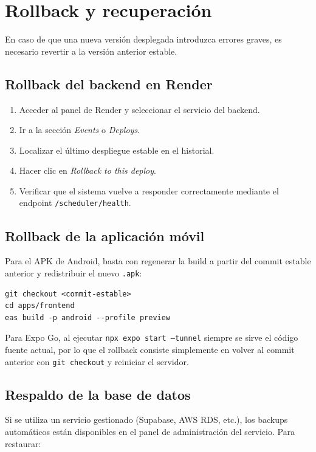 \section{Rollback y recuperación}

En caso de que una nueva versión desplegada introduzca errores graves, es necesario revertir a la versión anterior estable.

\subsection{Rollback del backend en Render}

\begin{enumerate}
    \item Acceder al panel de Render y seleccionar el servicio del backend.
    \item Ir a la sección \textit{Events} o \textit{Deploys}.
    \item Localizar el último despliegue estable en el historial.
    \item Hacer clic en \textit{Rollback to this deploy}.
    \item Verificar que el sistema vuelve a responder correctamente mediante el endpoint \texttt{/scheduler/health}.
\end{enumerate}

\subsection{Rollback de la aplicación móvil}

Para el APK de Android, basta con regenerar la build a partir del commit estable anterior y redistribuir el nuevo \texttt{.apk}:

\begin{lstlisting}
git checkout <commit-estable>
cd apps/frontend
eas build -p android --profile preview
\end{lstlisting}

Para Expo Go, al ejecutar \texttt{npx expo start --tunnel} siempre se sirve el código fuente actual, por lo que el rollback consiste simplemente en volver al commit anterior con \texttt{git checkout} y reiniciar el servidor.

\subsection{Respaldo de la base de datos}

Si se utiliza un servicio gestionado (Supabase, AWS RDS, etc.), los backups automáticos están disponibles en el panel de administración del servicio. Para restaurar:


